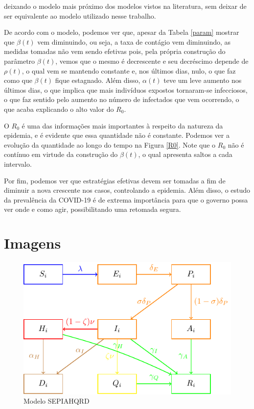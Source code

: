 \documentclass{article}
\begin{document}
\noindent deixando o modelo mais próximo dos modelos vistos na literatura, sem deixar de ser equivalente ao modelo utilizado nesse trabalho.

De acordo com o modelo, podemos ver que, apesar da Tabela \ref{param} mostrar que $\beta(t)$ vem diminuindo, ou seja, a taxa de contágio vem diminuindo, as medidas tomadas não vem sendo efetivas pois, pela própria construção do parâmetro $\beta(t)$, vemos que o mesmo é decrescente e seu decréscimo depende de $\rho(t)$, o qual vem se mantendo constante e, nos últimos dias, nulo, o que faz como que $\beta(t)$ fique estagnado. Além disso, $\alpha(t)$ teve um leve aumento nos últimos dias, o que implica que mais indivíduos expostos tornaram-se infecciosos, o que faz sentido pelo aumento no número de infectados que vem ocorrendo, o que acaba explicando o alto valor do $R_0$.

O $R_0$ é uma das informações mais importantes à respeito da natureza da epidemia, e é evidente que essa quantidade não é constante. Podemos ver a evolução da quantidade ao longo do tempo na Figura \ref{R0}. Note que o $R_0$ não é contínuo em virtude da construção do $\beta(t)$, o qual apresenta saltos a cada intervalo.

Por fim, podemos ver que estratégias efetivas devem ser tomadas a fim de diminuir a nova crescente nos casos, controlando a epidemia. Além disso, o estudo da prevalência da COVID-19 é de extrema importância para que o governo possa ver onde e como agir, possibilitando uma retomada segura.

\section*{Imagens}

\begin{figure}[H]
    \centering
    \includegraphics[page = 1]{Tikz - PDF/Tikz1.pdf}
    \caption{Modelo SEPIAHQRD}
    \label{sepiahqrd}
\end{figure}
\end{document}
